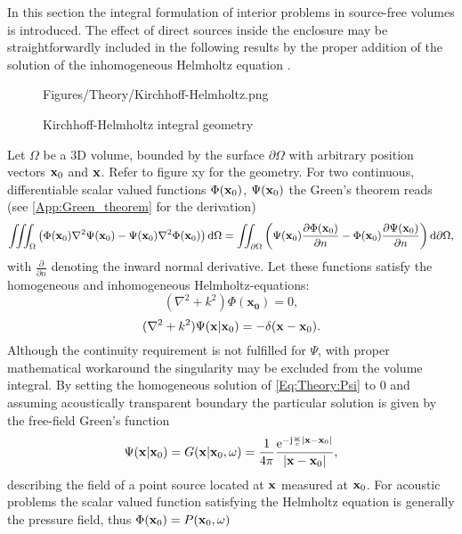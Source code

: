 In this section the integral formulation of interior problems in source-free volumes is introduced.
The effect of direct sources inside the enclosure may be straightforwardly included in the following results by the proper addition of the solution of the inhomogeneous Helmholtz equation \cite{Spors2005}.
\begin{figure}[!h]
	\centering
	\begin{overpic}[width = .65\columnwidth]{Figures/Theory/Kirchhoff-Helmholtz.png}
	\end{overpic}
\caption{Kirchhoff-Helmholtz integral geometry}
	\label{Fig:Theory:HIE_geometry}
\end{figure}

Let $\Omega$ be a 3D volume, bounded by the surface $\partial \Omega$ with arbitrary position vectors $\mathbf{x}_0$ and $\mathbf{x}$. Refer to figure xy for the geometry. For two continuous, differentiable scalar valued functions $\Phi(\mathbf{x}_0)$, $\Psi(\mathbf{x}_0)$ the Green's theorem reads (see \ref{App:Green_theorem} for the derivation)
\begin{equation}
\iiint_{\Omega}          \left(  \Phi(\mathbf{x}_0) \nabla^2 \Psi(\mathbf{x}_0) - \Psi(\mathbf{x}_0) \nabla^2 \Phi(\mathbf{x}_0)   \right)   \mathrm{d} \Omega = 
\iint_{\partial \Omega}  \left(  \Psi(\mathbf{x}_0) \frac{\partial \Phi(\mathbf{x}_0)}{\partial n}  - \Phi(\mathbf{x}_0) \frac{\partial \Psi(\mathbf{x}_0)}{\partial n}  \right)   \mathrm{d} \partial \Omega,
\label{Eq:Theory:Greens-theorem}
\end{equation}
with $\frac{\partial}{\partial n}$ denoting the inward normal derivative. Let these functions satisfy the homogeneous and inhomogeneous Helmholtz-equations:
\begin{equation}
(\nabla^2 + k^2)\Phi(\mathbf{x_0}) = 0,
\label{Eq:Theory:Phi}
\end{equation}
\begin{equation}
(\nabla^2 + k^2)\Psi(\mathbf{x}|\mathbf{x}_0) = -\delta(\mathbf{x} - \mathbf{x}_0).
\label{Eq:Theory:Psi}
\end{equation}
Although the continuity requirement is not fulfilled for $\Psi$, with proper mathematical workaround the singularity may be excluded from the volume integral\cite{Williams1999}. By setting the homogeneous solution of \eqref{Eq:Theory:Psi} to 0 and assuming acoustically transparent boundary the particular solution is given by the free-field Green's function
\begin{equation}
\Psi(\mathbf{x} | \mathbf{x}_0) = G(\mathbf{x}| \mathbf{x}_0,\omega) = \frac{1}{4\pi} \frac{\mathrm{e}^{-\mathrm{j} \frac{\omega}{c} |\mathbf{x}-\mathbf{x}_0|}}{|\mathbf{x}-\mathbf{x}_0|},
\end{equation}
describing the field of a point source located at $\mathbf{x}$ measured at $\mathbf{x}_0$. For acoustic problems the scalar valued function satisfying the Helmholtz equation is generally the pressure field, thus $\Phi(\mathbf{x}_0) = P(\mathbf{x}_0,\omega) $
 
